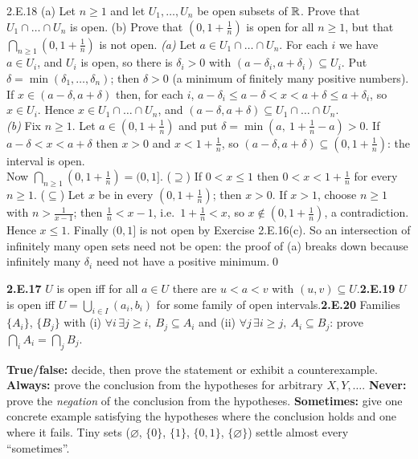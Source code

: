 \begin{bookex}[bonus]{2.E.18}
(a) Let $n\ge1$ and let $U_1,\dots,U_n$ be open subsets of $\mathbb{R}$. Prove that $U_1\cap\dots\cap U_n$ is open. (b) Prove that $(0,1+\frac1n)$ is open for all $n\ge1$, but that $\bigcap_{n\ge1}(0,1+\frac1n)$ is not open.
\solution
\emph{(a)} Let $a\in U_1\cap\dots\cap U_n$. For each $i$ we have $a\in U_i$, and $U_i$ is open, so there is $\delta_i>0$ with $(a-\delta_i,a+\delta_i)\subseteq U_i$. Put $\delta=\min(\delta_1,\dots,\delta_n)$; then $\delta>0$ (a minimum of finitely many positive numbers). If $x\in(a-\delta,a+\delta)$ then, for each $i$, $a-\delta_i\le a-\delta<x<a+\delta\le a+\delta_i$, so $x\in U_i$. Hence $x\in U_1\cap\dots\cap U_n$, and $(a-\delta,a+\delta)\subseteq U_1\cap\dots\cap U_n$.\\
\emph{(b)} Fix $n\ge1$. Let $a\in(0,1+\frac1n)$ and put $\delta=\min(a,\ 1+\frac1n-a)>0$. If $a-\delta<x<a+\delta$ then $x>0$ and $x<1+\frac1n$, so $(a-\delta,a+\delta)\subseteq(0,1+\frac1n)$: the interval is open.\\
Now $\bigcap_{n\ge1}(0,1+\frac1n)=(0,1]$. ($\supseteq$) If $0<x\le1$ then $0<x<1+\frac1n$ for every $n\ge1$. ($\subseteq$) Let $x$ be in every $(0,1+\frac1n)$; then $x>0$. If $x>1$, choose $n\ge1$ with $n>\frac1{x-1}$; then $\frac1n<x-1$, i.e.\ $1+\frac1n<x$, so $x\notin(0,1+\frac1n)$, a contradiction. Hence $x\le1$. Finally $(0,1]$ is not open by Exercise 2.E.16(c). So an intersection of infinitely many open sets need not be open: the proof of (a) breaks down because infinitely many $\delta_i$ need not have a positive minimum.\qed
\end{bookex}

\begin{trybox}[{2.E.17, 2.E.19, 2.E.20 \fO}]
\textbf{2.E.17} $U$ is open iff for all $a\in U$ there are $u<a<v$ with $(u,v)\subseteq U$.\quad \textbf{2.E.19} $U$ is open iff $U=\bigcup_{i\in I}(a_i,b_i)$ for some family of open intervals.\quad \textbf{2.E.20} Families $\{A_i\}$, $\{B_j\}$ with (i) $\forall i\,\exists j\ge i,\ B_j\subseteq A_i$ and (ii) $\forall j\,\exists i\ge j,\ A_i\subseteq B_j$: prove $\bigcap_iA_i=\bigcap_jB_j$.
\end{trybox}

\begin{strategy}
\textbf{True/false:} decide, then prove the statement or exhibit a counterexample. \textbf{Always:} prove the conclusion from the hypotheses for arbitrary $X,Y,\dots$. \textbf{Never:} prove the \emph{negation} of the conclusion from the hypotheses. \textbf{Sometimes:} give one concrete example satisfying the hypotheses where the conclusion holds and one where it fails. Tiny sets ($\varnothing$, $\{0\}$, $\{1\}$, $\{0,1\}$, $\{\varnothing\}$) settle almost every ``sometimes''.
\end{strategy}

